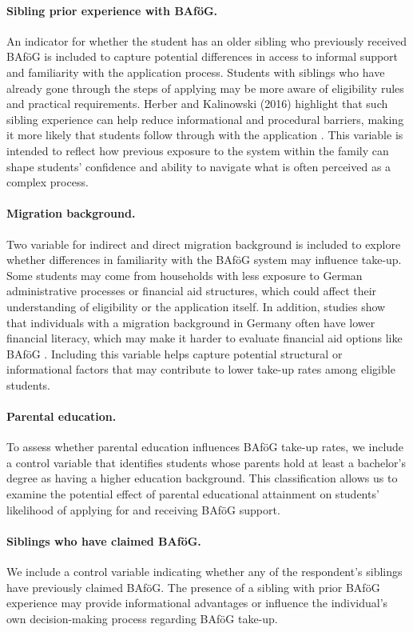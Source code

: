 \paragraph{Sibling prior experience with BAföG.} An indicator for whether the student has an older sibling who previously received BAföG is included to capture potential differences in access to informal support and familiarity with the application process. Students with siblings who have already gone through the steps of applying may be more aware of eligibility rules and practical requirements. Herber and Kalinowski (2016) highlight that such sibling experience can help reduce informational and procedural barriers, making it more likely that students follow through with the application \citep{herber_non-take-up_2019}. This variable is intended to reflect how previous exposure to the system within the family can shape students’ confidence and ability to navigate what is often perceived as a complex process.

\paragraph{Migration background.} Two variable for indirect and direct migration background is included to explore whether differences in familiarity with the BAföG system may influence take-up. 
Some students may come from households with less exposure to German administrative processes or financial aid structures, which could affect their understanding of eligibility or the application itself. 
In addition, studies show that individuals with a migration background in Germany often have lower financial literacy, which may make it harder to evaluate financial aid options like BAföG \citep{Tsegay_2024}. 
Including this variable helps capture potential structural or informational factors that may contribute to lower take-up rates among eligible students. 

\paragraph{Parental education.}
To assess whether parental education influences BAföG take-up rates, we include a control variable that identifies students whose parents hold at least a bachelor’s degree as having a higher education background. 
This classification allows us to examine the potential effect of parental educational attainment on students’ likelihood of applying for and receiving BAföG support.

\paragraph{Siblings who have claimed BAföG.}
We include a control variable indicating whether any of the respondent’s siblings have previously claimed BAföG. 
The presence of a sibling with prior BAföG experience may provide informational advantages or influence the individual’s own decision-making process regarding BAföG take-up.

